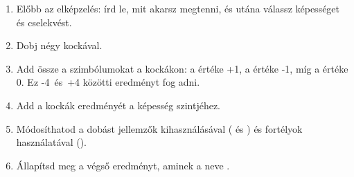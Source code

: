 \begin{enumerate}
    \item Előbb az elképzelés: írd le, mit akarsz megtenni, és utána válassz képességet és cselekvést.
    \item Dobj négy kockával.
    \item Add össze a szimbólumokat a kockákon: a \dice{+} értéke +1, a \dice{-} értéke -1, míg a  értéke 0. Ez -4~és~+4 közötti eredményt fog adni.
    \item Add a kockák eredményét a képesség szintjéhez.
    \item Módosíthatod a dobást jellemzők kihasználásával ( és ) és fortélyok használatával ().
    \item Állapítsd meg a végső eredményt, aminek a neve .
\end{enumerate}
